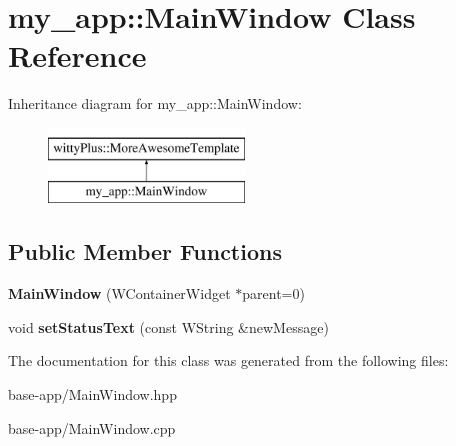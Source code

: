 \hypertarget{classmy__app_1_1MainWindow}{
\section{my\_\-app::MainWindow Class Reference}
\label{classmy__app_1_1MainWindow}
}
Inheritance diagram for my\_\-app::MainWindow:\begin{figure}[H]
\begin{center}
\leavevmode
\includegraphics[height=2.000000cm]{classmy__app_1_1MainWindow}
\end{center}
\end{figure}
\subsection*{Public Member Functions}
\begin{DoxyCompactItemize}
\item 
\hypertarget{classmy__app_1_1MainWindow_a04ccab522f71562bfa98a84f9b462914}{
{\bfseries MainWindow} (WContainerWidget $\ast$parent=0)}
\label{classmy__app_1_1MainWindow_a04ccab522f71562bfa98a84f9b462914}

\item 
\hypertarget{classmy__app_1_1MainWindow_a665c0fc331a410ab2bd0a6cc998413ac}{
void {\bfseries setStatusText} (const WString \&newMessage)}
\label{classmy__app_1_1MainWindow_a665c0fc331a410ab2bd0a6cc998413ac}

\end{DoxyCompactItemize}


The documentation for this class was generated from the following files:\begin{DoxyCompactItemize}
\item 
base-\/app/MainWindow.hpp\item 
base-\/app/MainWindow.cpp\end{DoxyCompactItemize}
